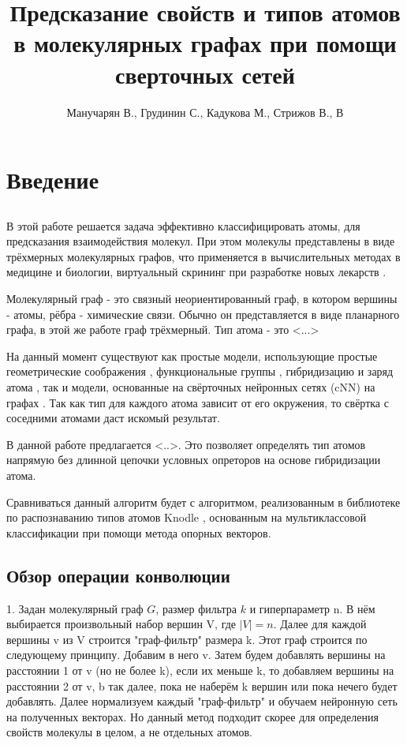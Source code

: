 \documentclass[12pt,twoside]{article}
\title
    [] %
    {Предсказание свойств и типов атомов в молекулярных графах при помощи сверточных сетей}
\author
    [] %
    {Манучарян В., Грудинин С., Кадукова М., Стрижов В., В} %
    [Манучарян В., Грудинин С., Кадукова М., Стрижов В., В] %
\begin{document}
\maketitle
\section{Введение}
\subsection{}
	В этой работе решается задача эффективно классифицировать атомы, для предсказания взаимодействия молекул. При этом молекулы представлены \cite{} в виде трёхмерных молекулярных графов, что применяется в вычислительных методах в медицине и биологии, виртуальный скрининг при разработке новых лекарств \cite{article2}.
	
	Молекулярный граф - это связный неориентированный граф, в котором вершины - атомы, рёбра - химические связи. Обычно он представляется в виде планарного графа, в этой же работе граф трёхмерный. Тип атома - это <...>
	
	На данный момент существуют как простые модели, использующие простые геометрические соображения \cite{article3}, функциональные группы \cite{article4}, гибридизацию и заряд атома \cite{article5,article6,article7,article8}, так и модели, основанные на свёрточных нейронных сетях (cNN) на графах \cite{article15,article16,article20}. Так как тип для каждого атома зависит от его окружения, то свёртка с соседними атомами даст искомый результат.
	
	В данной работе предлагается <..>. Это позволяет определять тип атомов напрямую без длинной цепочки условных опреторов на основе гибридизации атома.
	
	Сравниваться данный алгоритм будет с алгоритмом, реализованным в библиотеке по распознаванию типов атомов Knodle \cite{article1}, основанным на мультиклассовой классификации при помощи метода опорных векторов.
	
\subsection{Обзор операции конволюции}
1. Задан молекулярный граф $G$, размер фильтра $k$ и гиперпараметр n. В нём выбирается произвольный набор вершин V, где $|V|=n$. Далее для каждой вершины v из V строится "граф-фильтр" размера k. Этот граф строится по следующему принципу. Добавим в него v. Затем будем добавлять вершины на расстоянии 1 от v (но не более k), если их меньше k, то добавляем вершины на расстоянии 2 от v, b так далее, пока не наберём k вершин или пока нечего будет добавлять. Далее нормализуем каждый "граф-фильтр" и обучаем нейронную сеть на полученных векторах.\cite{article15} Но данный метод подходит скорее для определения свойств молекулы в целом, а не отдельных атомов.
\end{document}
